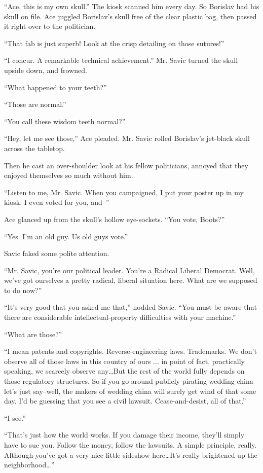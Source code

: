 \documentclass[20 pt,twoside,extrafontsizes,final]{memoir}
\begin{document}
``Ace, this is my own skull.'' The kiosk scanned him every day. So Borislav had his skull on file.
Ace juggled Borislav's skull free of the clear plastic bag, then passed it right over to the politician.

``That fab is just superb! Look at the crisp detailing on those sutures!''

``I concur. A remarkable technical achievement.'' Mr. Savic turned the skull upside down, and frowned.

``What happened to your teeth?''

``Those are normal.''

``You call these wisdom teeth normal?''

``Hey, let me see those,'' Ace pleaded. Mr. Savic rolled Borislav's jet-black skull across the tabletop.

Then he cast an over-shoulder look at his fellow politicians, annoyed that they enjoyed themselves so much without him.

``Listen to me, Mr. Savic. When you campaigned, I put your poster up in my kiosk. I even voted for you, and--''

Ace glanced up from the skull's hollow eye-sockets. ``You vote, Boots?''

``Yes. I'm an old guy. Us old guys vote.''

Savic faked some polite attention.

``Mr. Savic, you're our political leader. You're a Radical Liberal Democrat. Well, we've got ourselves a pretty radical, liberal situation here. What are we supposed to do now?''

``It's very good that you asked me that,'' nodded Savic. ``You must be aware that there are considerable intellectual-property difficulties with your machine.''

``What are those?''

``I mean patents and copyrights. Reverse-engineering laws. Trademarks. We don't observe all of those laws in this country of ours ... in point of fact, practically speaking, we scarcely observe any\dots But the rest of the world fully depends on those regulatory structures. So if you go around publicly pirating wedding china--let's just say--well, the makers of wedding china will surely get wind of that some day. I'd be guessing that you see a civil lawsuit. Cease-and-desist, all of that.''

``I see.''

``That's just how the world works. If you damage their income, they'll simply have to sue you. Follow the money, follow the lawsuits. A simple principle, really. Although you've got a very nice little sideshow here\dots It's really brightened up the neighborhood\dots''
\end{document}
